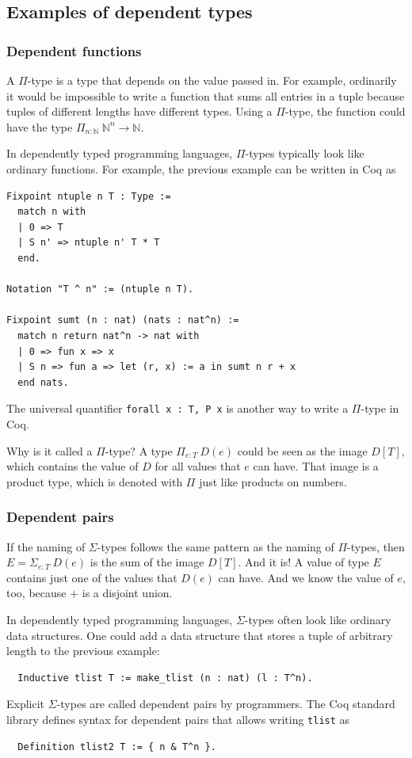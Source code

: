\documentclass[english, 12pt, a4paper, sci, a-1b, online]{aaltothesis}
\newcommand\icoq[1]{\texttt{#1}}
\begin{document}
\subsection{Examples of dependent types}
\subsubsection{Dependent functions}\label{pitypes}

A $\Pi$-type is a type that depends on the value passed in. For example, ordinarily it would be impossible to write a function that sums all entries in a tuple because tuples of different lengths have different types. Using a $\Pi$-type, the function could have the type $\Pi_{n : \mathbb N}~\mathbb N^n \to \mathbb N$.

In dependently typed programming languages, $\Pi$-types typically look like ordinary functions. For example, the previous example can be written in Coq as
\begin{verbatim}
Fixpoint ntuple n T : Type :=
  match n with
  | 0 => T
  | S n' => ntuple n' T * T
  end.

Notation "T ^ n" := (ntuple n T).

Fixpoint sumt (n : nat) (nats : nat^n) :=
  match n return nat^n -> nat with
  | 0 => fun x => x
  | S n => fun a => let (r, x) := a in sumt n r + x
  end nats.
\end{verbatim}

The universal quantifier \icoq{forall x : T, P x} is another way to write a $\Pi$-type in Coq.

Why is it called a $\Pi$-type? A type $\Pi_{e:T}~D(e)$ could be seen as the image $D[T]$, which contains the value of $D$ for all values that $e$ can have. That image is a product type, which is denoted with $\Pi$ just like products on numbers.

\subsubsection{Dependent pairs}

If the naming of $\Sigma$-types follows the same pattern as the naming of $\Pi$-types, then $E = \Sigma_{e:T}~D(e)$ is the sum of the image $D[T]$. And it is! A value of type $E$ contains just one of the values that $D(e)$ can have. And we know the value of $e$, too, because $+$ is a disjoint union.

In dependently typed programming languages, $\Sigma$-types often look like ordinary data structures. One could add a data structure that stores a tuple of arbitrary length to the previous example:
\begin{verbatim}
  Inductive tlist T := make_tlist (n : nat) (l : T^n).
\end{verbatim}
Explicit $\Sigma$-types are called dependent pairs by programmers. The Coq standard library defines syntax for dependent pairs that allows writing \icoq{tlist} as
\begin{verbatim}
  Definition tlist2 T := { n & T^n }.
\end{verbatim}
\end{document}
